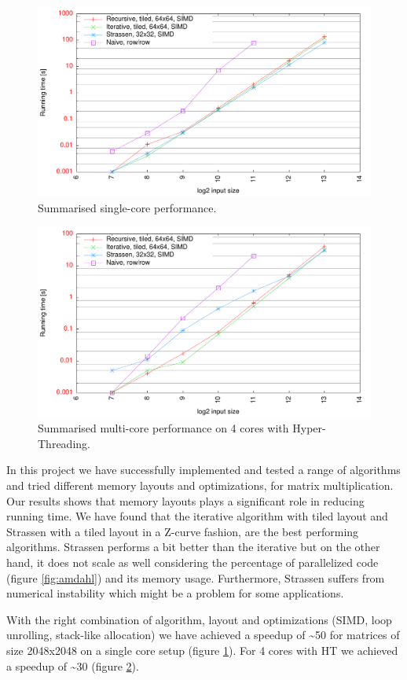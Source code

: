 \begin{figure}[h!]
  \centering
  \includegraphics[width=\textwidth]{"../project2/gnuplots/best_single"}
  \caption{Summarised single-core performance.}
  \label{fig:best_single}
\end{figure}

\begin{figure}[h!]
  \centering
  \includegraphics[width=\textwidth]{"../project2/gnuplots/best_parallel"}
  \caption{Summarised multi-core performance on 4 cores with Hyper-Threading.}
  \label{fig:best_parallel}
\end{figure}

In this project we have successfully implemented and tested a range of algorithms and tried different memory layouts and optimizations, for matrix multiplication. Our results shows that memory layouts plays a significant role in reducing running time. We have found that the iterative algorithm with tiled layout and Strassen with a tiled layout in a Z-curve fashion, are the best performing algorithms. Strassen performs a bit better than the iterative but on the other hand, it does not scale as well considering the percentage of parallelized code (figure \ref{fig:amdahl}) and its memory usage. Furthermore, Strassen suffers from numerical instability which might be a problem for some applications.

With the right combination of algorithm, layout and optimizations (SIMD, loop unrolling, stack-like allocation) we have achieved a speedup of \textasciitilde 50 for matrices of size 2048x2048 on a single core setup (figure \ref{fig:best_single}). For 4 cores with HT we achieved a speedup of \textasciitilde 30 (figure \ref{fig:best_parallel}).